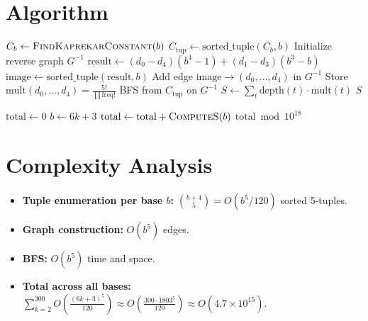 \documentclass[11pt,a4paper]{article}
\begin{document}
\section{Algorithm}

\begin{algorithm}[H]
\caption{Compute $S(b)$}
\begin{algorithmic}[1]
  \State $C_b \gets \Call{FindKaprekarConstant}{b}$
  \State $C_{\text{tup}} \gets \text{sorted\_tuple}(C_b, b)$
  \State Initialize reverse graph $G^{-1}$
    \State $\text{result} \gets (d_0 - d_4)(b^4 - 1) + (d_1 - d_3)(b^3 - b)$
    \State $\text{image} \gets \text{sorted\_tuple}(\text{result}, b)$
    \State Add edge $\text{image} \to (d_0, \ldots, d_4)$ in $G^{-1}$
    \State Store $\text{mult}(d_0, \ldots, d_4) = \frac{5!}{\prod \text{freq}!}$
  \EndFor
  \State BFS from $C_{\text{tup}}$ on $G^{-1}$
  \State $S \gets \sum_t \text{depth}(t) \cdot \text{mult}(t)$
  \State \Return $S$
\EndProcedure
\end{algorithmic}
\end{algorithm}

\begin{algorithm}[H]
\caption{Main computation}
\begin{algorithmic}[1]
  \State $\text{total} \gets 0$
    \State $b \gets 6k + 3$
    \State $\text{total} \gets \text{total} + \Call{ComputeS}{b}$
  \EndFor
  \State \Return $\text{total} \bmod 10^{18}$
\EndProcedure
\end{algorithmic}
\end{algorithm}

\section{Complexity Analysis}

\begin{itemize}
  \item \textbf{Tuple enumeration per base $b$:} $\binom{b+4}{5} = O(b^5/120)$ sorted 5-tuples.
  \item \textbf{Graph construction:} $O(b^5)$ edges.
  \item \textbf{BFS:} $O(b^5)$ time and space.
  \item \textbf{Total across all bases:} $\sum_{k=2}^{300} O\!\left(\frac{(6k+3)^5}{120}\right) \approx O\!\left(\frac{300 \cdot 1803^5}{120}\right) \approx O(4.7 \times 10^{15})$.
\end{itemize}
\end{document}
